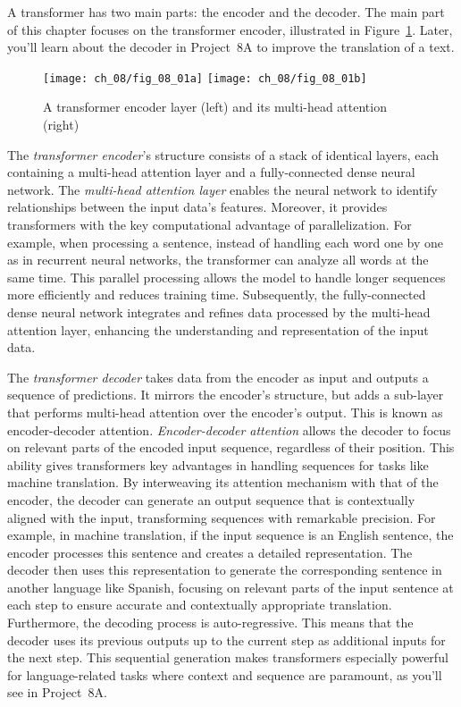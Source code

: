 A transformer has two main parts: the encoder and the decoder. The main part of this chapter focuses on the transformer encoder,  illustrated in Figure~\ref{fig:08:encoder}. Later, you'll learn about the decoder in Project~8A to improve the translation of a text.

\begin{figure}[H]
    \texttt{[image: ch\_08/fig\_08\_01a]} %
    \texttt{[image: ch\_08/fig\_08\_01b]} %
    \caption{A transformer encoder layer (left) and its multi-head attention (right)}
    \label{fig:08:encoder}
\end{figure}

The \emph{transformer encoder}'s structure consists of a stack of identical layers, each containing a multi-head attention layer and a fully-connected dense neural network. 
The \emph{multi-head attention layer} enables the neural network to identify relationships between the input data's features. Moreover, it provides transformers with the key computational advantage of parallelization. 
For example, when processing a sentence, instead of handling each word one by one as in recurrent neural networks, the transformer can analyze all words at the same time. This parallel processing allows the model to handle longer sequences more efficiently and reduces training time.
Subsequently, the fully-connected dense neural network integrates and refines data processed by the multi-head attention layer, enhancing the understanding and representation of the input data.

The \emph{transformer decoder} takes data from the encoder as input and outputs a sequence of predictions. It mirrors the encoder's structure, but adds a sub-layer that performs multi-head attention over the encoder's output. This is known as encoder-decoder attention. \emph{Encoder-decoder attention} allows the decoder to focus on relevant parts of the encoded input sequence, regardless of their position. This ability gives transformers key advantages in handling sequences for tasks like machine translation. By interweaving its attention mechanism with that of the encoder, the decoder can generate an output sequence that is contextually aligned with the input, transforming sequences with remarkable precision. For example, in machine translation, if the input sequence is an English sentence, the encoder processes this sentence and creates a detailed representation. The decoder then uses this representation to generate the corresponding sentence in another language like Spanish, focusing on relevant parts of the input sentence at each step to ensure accurate and contextually appropriate translation.  Furthermore, the decoding process is auto-regressive. This means that the decoder uses its previous outputs up to the current step as additional inputs for the next step. This sequential generation makes transformers especially powerful for language-related tasks where context and sequence are paramount, as you'll see in Project~8A.

